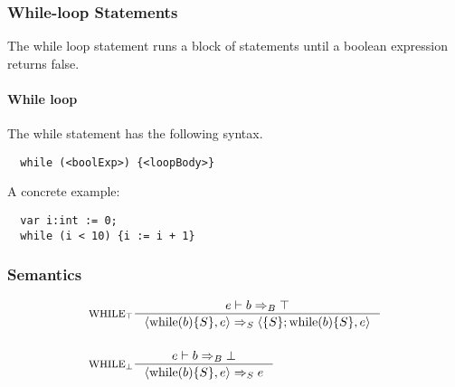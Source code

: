 \subsubsection{While-loop Statements}
\label{subsec:whileLoopStatements}

The while loop statement runs a block of statements until a boolean expression returns false.

\paragraph{While loop}
\label{sec:whileLoop}

The while statement has the following syntax.

\begin{verbatim}
  while (<boolExp>) {<loopBody>}
\end{verbatim}

A concrete example:

\begin{verbatim}
  var i:int := 0;
  while (i < 10) {i := i + 1}
\end{verbatim}

\subsubsection{Semantics}

\begin{align*}
&\inference[$\text{WHILE}_\top$]{e \vdash b \Rightarrow_B \top}
                       {\Braket{\Twhile(b)\{S\},e} \Rightarrow_S \Braket{\{S\}; \Twhile (b)\{S\},e}}
\\\\
&\inference[$\text{WHILE}_\bot$]{e \vdash b \Rightarrow_B \bot}
                       {\Braket{\Twhile(b)\{S\},e} \Rightarrow_S e}
\end{align*}